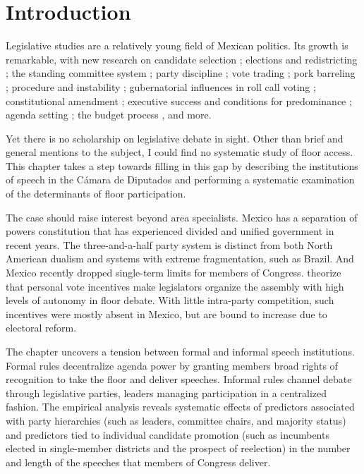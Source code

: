 \documentclass[letter,12pt]{article}
\begin{document}
\doublespacing

\section{Introduction} %

Legislative studies are a relatively young field of Mexican politics. Its growth is remarkable, with new research on candidate selection \citep{ascencio.kerevel.cand-sel-beh.2021}; elections and redistricting \citep{magar.altman.mcd.trelles2016pg}; the standing committee system \citep{bejar.Comisiones2009ed.book}; party discipline \citep{tellez-del-rio.2018}; vote trading \citep{lopez.lara.aldf2013}; pork barreling \citep{kerevelPork2015}; procedure and instability \citep{heller.weldon.2003}; gubernatorial influences in roll call voting \citep{rosas.langston.2011}; constitutional amendment \citep{casar.marvan2014book}; executive success \citep{bejarQuienLegisla2012} and conditions for predominance \citep{weldon.1997}; agenda setting \citep{casar.agsetting.2016}; the budget process \citep{weldon.2002}, and more.

Yet there is no scholarship on legislative debate in sight. Other than brief and general mentions to the subject, I could find no systematic study of floor access. This chapter takes a step towards filling in this gap by describing the institutions of speech in the Cámara de Diputados and performing a systematic examination of the determinants of floor participation.

The case should raise interest beyond area specialists. Mexico has a separation of powers constitution that has experienced divided and unified government in recent years. The three-and-a-half party system is distinct from both North American dualism and systems with extreme fragmentation, such as Brazil. And Mexico recently dropped single-term limits for members of Congress. \citet{proksch-slapin2015book} theorize that personal vote incentives make legislators organize the assembly with high levels of autonomy in floor debate. With little intra-party competition, such incentives were mostly absent in Mexico, but are bound to increase due to electoral reform. 

The chapter uncovers a tension between formal and informal speech institutions. Formal rules decentralize agenda power by granting members broad rights of recognition to take the floor and deliver speeches. Informal rules channel debate through legislative parties, leaders managing participation in a centralized fashion. The empirical analysis reveals systematic effects of predictors associated with party hierarchies (such as leaders, committee chairs, and majority status) and predictors tied to individual candidate promotion (such as incumbents elected in single-member districts and the prospect of reelection) in the number and length of the speeches that members of Congress deliver. 
\end{document}
